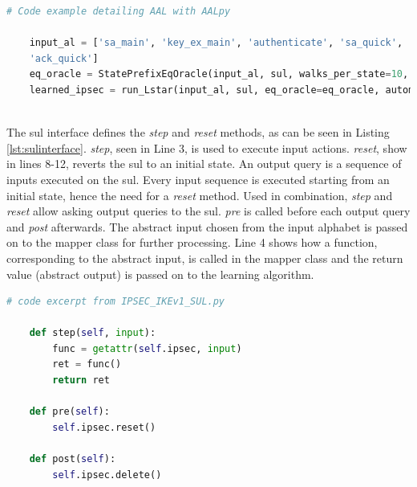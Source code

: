 \begin{lstlisting}[float=h, caption=Equivalence Query code, label=lst:eqcode, language=python]
	# Code example detailing AAL with AALpy
	
	input_al = ['sa_main', 'key_ex_main', 'authenticate', 'sa_quick', 
	'ack_quick']
	eq_oracle = StatePrefixEqOracle(input_al, sul, walks_per_state=10, walk_len=10)
	learned_ipsec = run_Lstar(input_al, sul, eq_oracle=eq_oracle, automaton_type='mealy', cache_and_non_det_check=True)
	
\end{lstlisting}

The \ac{sul} interface defines the \emph{step} and \emph{reset} methods, as can be seen in Listing \ref{lst:sulinterface}. \emph{step}, seen in Line 3, is used to execute input actions. \emph{reset}, show in lines 8-12, reverts the \ac{sul} to an initial state. An output query is a sequence of inputs executed on the \ac{sul}. Every input sequence is executed starting from an initial state, hence the need for a \emph{reset} method. Used in combination, \emph{step} and \emph{reset} allow asking output queries to the \ac{sul}. \emph{pre} is called before each output query and \emph{post} afterwards. The abstract input chosen from the input alphabet is passed on to the mapper class for further processing. Line 4 shows how a function, corresponding to the abstract input, is called in the mapper class and the return value (abstract output) is passed on to the learning algorithm. \\

\begin{lstlisting}[float=h, caption=SUL interface, label=lst:sulinterface, language=python]
	# code excerpt from IPSEC_IKEv1_SUL.py
	
	def step(self, input):
		func = getattr(self.ipsec, input)
		ret = func()
		return ret
	
	def pre(self):
		self.ipsec.reset()
	
	def post(self):
		self.ipsec.delete()
\end{lstlisting}

